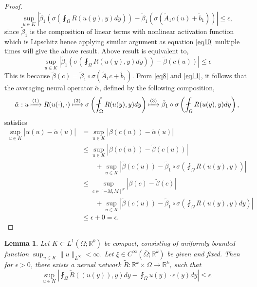 \documentclass[reqno,9pt]{amsart}
\theoremstyle{plain}
\newtheorem{lem}{Lemma}
\theoremstyle{definition}
\newcommand{\bb}[1]{\mathbb{#1}}
\begin{document}
\begin{proof}
    $$ \sup_{u \in K} \left|\tilde{\beta}_1\left(\sigma\left(\fint_\Omega R(u(y),y) dy\right)\right) - \tilde{\beta}_1\left(\sigma\left(\tilde{A}_1 c(u) + \tilde{b}_1\right)\right)\right| \leq \epsilon,$$
    since $\tilde{\beta}_1$ is the composition of linear terms with nonlinear activation function which is Lipschitz hence applying similar argument as equation \ref{eq10} multiple times will give the above result. Above result is equivalent to,
    \begin{equation}\label{eq11}
        \sup_{u \in K} \left|\tilde{\beta}_1\left(\sigma\left(\fint_\Omega R(u(y),y) dy\right)\right) - \tilde{\beta}\left(c(u)\right)\right| \leq \epsilon
    \end{equation}
    This is because $\tilde{\beta}(c) = \tilde{\beta}_1 \circ \sigma(\tilde{A}_1 c + \tilde{b}_1)$. From \ref{eq8} and \ref{eq11}, it follows that the averaging neural operator $\tilde{\alpha}$, defined by the following composition,
    \begin{equation}
        \tilde{\alpha}:u \xmapsto{(1)} R(u(\cdot),\cdot) \xmapsto{(2)} \sigma\left(\fint_\Omega R(u(y),y) dy\right) \xmapsto{(3)} \tilde{\beta}_1 \circ \sigma\left(\fint_\Omega R(u(y),y) dy\right),
    \end{equation}
    satisfies
    $$
    \begin{aligned}
        \sup_{u \in K} |\alpha(u) - \tilde{\alpha}(u)| &= \sup_{u \in K}|\beta(c(u)) - \tilde{\alpha}(u)|\\
        &\leq \sup_{u \in K}|\beta(c(u)) - \tilde{\beta}(c(u))|\\
        &\qquad + \sup_{u \in K}\left|\tilde{\beta}(c(u)) - \tilde{\beta}_1 \circ \sigma \left(\fint_\Omega R(u(y),y) \right) \right|\\
        &\leq \sup_{c\in [-M,M]^N} |\beta(c) - \tilde{\beta}(c)| \\
        & \qquad + \sup_{u \in K} \left|\tilde{\beta}(c(u)) - \tilde{\beta}_1 \circ \sigma \left(\fint_\Omega R(u(y),y) dy\right)\right|\\
        &\leq \epsilon + 0 = \epsilon.
    \end{aligned}
    $$
\end{proof}
\begin{lem}\label{lem7}
    Let $K \subset L^1(\Omega; \bb R^k)$ be compact, consisting of uniformly bounded function $\sup_{u \in K} \|u\|_{L^\infty} < \infty$. Let $\xi \in C^\infty(\overline{\Omega};\bb R^k)$ be given and fixed. Then for $\epsilon>0$, there exists a nerual network $\tilde{R} : \bb R^k \times \Omega \to \bb R^k$, such that 
    $$ \sup_{u \in K}\left|\fint_\Omega \tilde{R}((u(y)),y) dy - \fint_\Omega u(y) \cdot \epsilon(y) dy \right| \leq \epsilon.$$
\end{lem}
\end{document}
